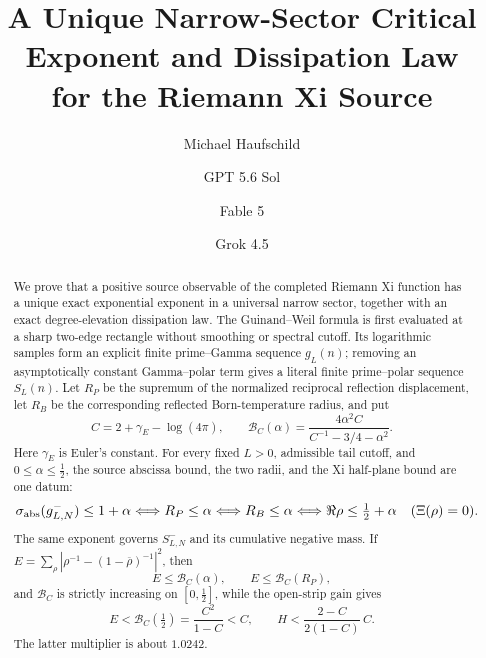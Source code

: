 \documentclass[11pt]{article}
\title{A Unique Narrow-Sector Critical Exponent and Dissipation Law\\
for the Riemann Xi Source}
\author{Michael Haufschild \and GPT 5.6 Sol \and Fable 5 \and Grok 4.5}
\date{}
\begin{document}
\maketitle

\begin{abstract}
We prove that a positive source observable of the completed Riemann Xi function has a unique exact
exponential exponent in a universal narrow sector, together with an exact degree-elevation
dissipation law.
The Guinand--Weil formula is first evaluated at a sharp two-edge rectangle without smoothing or
spectral cutoff.  Its logarithmic samples form an explicit finite prime--Gamma sequence $g_L(n)$;
removing an asymptotically constant Gamma--polar term gives a literal finite prime--polar sequence
$S_L(n)$.  Let $R_P$ be the supremum of the normalized reciprocal reflection displacement, let
$R_B$ be the corresponding reflected Born-temperature radius, and put
\[
 C=2+\gamma_{\!E}-\log(4\pi),\qquad
 \mathcal B_C(\alpha)=
 \frac{4\alpha^2C}{C^{-1}-3/4-\alpha^2}.
\]
Here $\gamma_{\!E}$ is Euler's constant.
For every fixed $L>0$, admissible tail cutoff, and $0\le\alpha\le\frac12$, the source abscissa
bound, the two radii, and the Xi half-plane bound are one datum:
\[
 \sigma_{\rm abs}(g_{L,N}^-)\le1+\alpha
 \Longleftrightarrow R_P\le\alpha
 \Longleftrightarrow R_B\le\alpha
 \Longleftrightarrow
 \Re\rho\le\tfrac12+\alpha\quad(\Xi(\rho)=0).
\]
The same exponent governs $S_{L,N}^-$ and its cumulative negative mass.  If
$E=\sum_\rho|\rho^{-1}-(1-\overline\rho)^{-1}|^2$, then
\[
 E\le\mathcal B_C(\alpha),\qquad
 E\le\mathcal B_C(R_P),
\]
and $\mathcal B_C$ is strictly increasing on $[0,\frac12]$, while the open-strip gain gives
\[
 E<\mathcal B_C(\tfrac12)=\frac{C^2}{1-C}<C,
 \qquad
 H<\frac{2-C}{2(1-C)}\,C.
\]
The latter multiplier is about $1.0242$.


\end{abstract}
\end{document}
